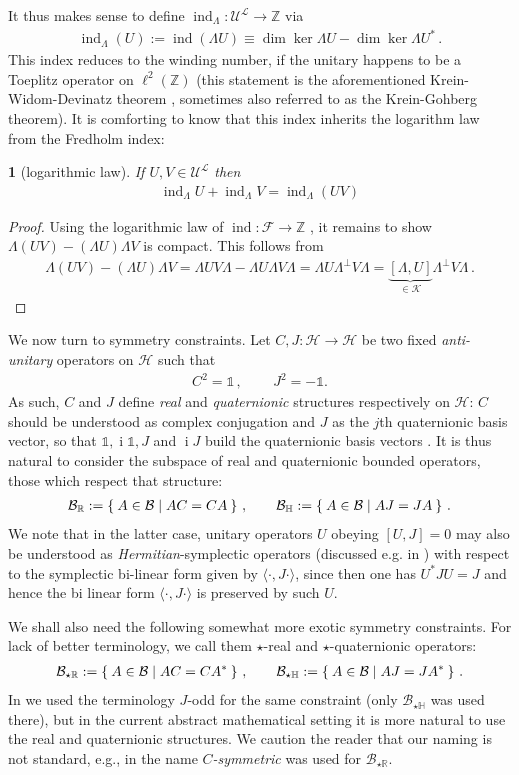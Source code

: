 \documentclass[a4paper,10pt]{article}
\numberwithin{equation}{section}
\theoremstyle{plain}
\theoremstyle{plain}
\newtheorem{lem}[thm]{\protect\lemmaname}
\theoremstyle{plain}
\theoremstyle{plain}
\theoremstyle{plain}
\theoremstyle{remark}
\theoremstyle{definition}
\theoremstyle{plain}
\providecommand{\lemmaname}{Lemma}
\newcommand{\ii}{\operatorname{i}}
\newcommand{\ZZ}{\mathbb{Z}}
\newcommand{\RR}{\mathbb{R}}
\newcommand{\calB}{\mathcal{B}}
\newcommand{\calF}{\mathcal{F}}
\newcommand{\calU}{\mathcal{U}}
\newcommand{\calH}{\mathcal{H}}
\newcommand{\calK}{\mathcal{K}}
\newcommand{\calL}{\mathcal{L}}
\newcommand{\bbLambda}{\mathbb{\Lambda}}
\newcommand{\ip}[2]{\langle #1, #2 \rangle}
\newcommand{\Id}{\mathds{1}}
\newcommand{\HH}{\mathbb{H}}
\newcommand{\findex}{\operatorname{ind}}
\newcommand{\eq}[1]{\begin{align*}#1\end{align*}}
\newcommand{\eql}[1]{\begin{align}#1\end{align}}
\begin{document}
	It thus makes sense to define $ \findex_\Lambda : \calU^\calL \to \ZZ$ via \eql{\findex_\Lambda(U) := \findex(\bbLambda U)\equiv\dim\ker \bbLambda U - \dim\ker \bbLambda U^\ast\label{eq:index of local unitary}\,.} This index reduces to the winding number, if the unitary happens to be a Toeplitz operator on $\ell^2(\ZZ)$ (this statement is the aforementioned Krein-Widom-Devinatz theorem \cite[pp. 185]{Douglas1998}, sometimes also referred to as the Krein-Gohberg theorem).
	It is comforting to know that this index inherits the logarithm law from the Fredholm index:
	\begin{lem}[logarithmic law]\label{lem:log law for index_Lam} If $U,V\in\calU^\calL$ then \eql{\findex_\Lambda U + \findex_\Lambda V = \findex_\Lambda (UV)}
	\end{lem}
	\begin{proof}
		Using the logarithmic law of $\findex:\calF\to\ZZ$ \cite{Booss_Topology_and_Analysis}, it remains to show $\bbLambda(UV)-(\bbLambda U)\bbLambda V$ is compact. This follows from \eq{\bbLambda(UV)-(\bbLambda U)\bbLambda V
			=\Lambda UV\Lambda-\Lambda U\Lambda V\Lambda
			=\Lambda U\Lambda^\perp V\Lambda
			=\underbrace{[\Lambda, U]}_{\in\calK}\Lambda^\perp V\Lambda\,.
		}
	\end{proof}
	
	
	
	
	We now turn to symmetry constraints. Let $C,J:\calH\to\calH$ be two fixed \emph{anti-unitary} operators on $\calH$ such that \eq{C^2=\Id\,,\qquad\,J^2=-\Id.}
	As such, $C$ and $J$ define \emph{real} and \emph{quaternionic} structures respectively on $\calH$: $C$ should be understood as complex conjugation and $J$ as the $j$th quaternionic basis vector, so that $\Id,\ii\Id,J$ and $\ii J$ build the quaternionic basis vectors \cite{Baez2012}. It is thus natural to consider the subspace of real and quaternionic bounded operators, those which respect that structure: \eql{\label{eq:real and quaternionic operators} \calB_\RR := \Set{A\in\calB | AC=CA} \,,\qquad \calB_\HH := \Set{A\in\calB | AJ=JA}\,. }
	We note that in the latter case, unitary operators $U$ obeying $[U,J]=0$ may also be understood as \emph{Hermitian}-symplectic operators (discussed e.g. in \cite[(3.7)]{Shapiro2021}) with respect to the symplectic bi-linear form given by $\ip{\cdot}{J\cdot}$, since then one has $U^\ast J U = J$ and hence the bi linear form $\ip{\cdot}{J\cdot}$ is preserved by such $U$.
	
	We shall also need the following somewhat more exotic symmetry constraints. For lack of better terminology, we call them $\star$-real and $\star$-quaternionic operators: \eql{\label{eq:star real and quaternionic operators} \calB_{\star\RR} := \Set{A\in\calB | AC=CA^\ast} \,,\qquad \calB_{\star\HH} := \Set{A\in\calB | AJ=JA^\ast}\,. }
	In \cite{FSSWY22} we used the terminology $J$-odd for the same constraint (only $\calB_{\star\HH}$ was used there), but in the current abstract mathematical setting it is more natural to use the real and quaternionic structures. We caution the reader that our naming is not standard, e.g., in \cite{garcia2006complex} the name \emph{$C$-symmetric} was used for $\calB_{\star\RR}$.
	
\end{document}
